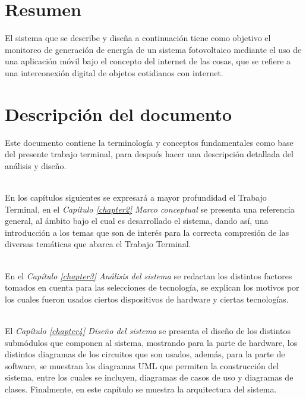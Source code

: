 \section{Resumen}
El sistema que se describe y diseña a continuación tiene como objetivo el monitoreo de generación de energía de un sistema fotovoltaico mediante el uso de una aplicación móvil bajo el concepto del internet de las cosas, que se refiere a una interconexión digital de objetos cotidianos con internet.

\section{Descripción del documento}
Este documento contiene la terminología y conceptos fundamentales como base del presente trabajo terminal, para después hacer una descripción detallada del análisis y diseño. 

\\
En los capítulos siguientes se expresará a mayor profundidad el Trabajo Terminal, en el \textit{Capítulo \ref{chapter2} Marco conceptual} se presenta una referencia general, al ámbito bajo el cual es desarrollado el sistema, dando así, una introducción a los temas que son de interés para la correcta compresión de las diversas temáticas que abarca el Trabajo Terminal.

\\
En el \textit{Capítulo \ref{chapter3} Análisis del sistema} se redactan los distintos factores tomados en cuenta para las selecciones de tecnología, se explican los motivos por los cuales fueron usados ciertos dispositivos de hardware y ciertas tecnologías.

\\
El \textit{Capítulo \ref{chapter4} Diseño del sistema} se presenta el diseño de los distintos submódulos que componen al sistema, mostrando para la parte de hardware, los distintos diagramas de los circuitos que son usados, además, para la parte de software, se muestran los diagramas UML que permiten la construcción del sistema, entre los cuales se incluyen, diagramas de casos de uso y diagramas de clases. Finalmente, en este capítulo se muestra la arquitectura del sistema. %
\\

